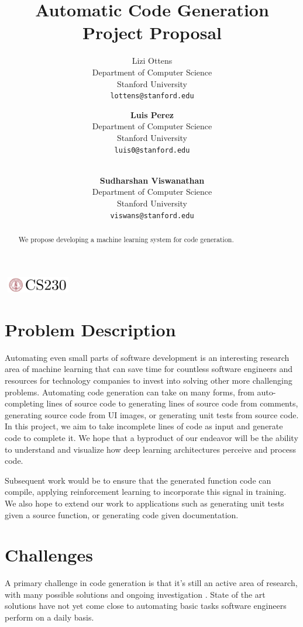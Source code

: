 \documentclass{article}
\title{Automatic Code Generation Project Proposal}
\author{
  Lizi Ottens  \\
  Department of Computer Science\\
  Stanford University\\
  \texttt{lottens@stanford.edu}
  
  \and
  
  \textbf{Luis Perez} \\
  Department of Computer Science \\
  Stanford University \\
  \texttt{luis0@stanford.edu}
  
  \and
  
  \\
  \textbf{Sudharshan Viswanathan} \\
  Department of Computer Science \\
  Stanford University \\
  \texttt{viswans@stanford.edu}
}
\begin{document}

\begin{center}
\includegraphics[width=3cm, height=0.7cm]{CS230}
\end{center}

\maketitle

\begin{abstract}
We propose developing a machine learning system for code generation.
\end{abstract}

\section{Problem Description}	
Automating even small parts of software development is an interesting research area \cite{survey} of machine learning that can save time for countless software engineers and resources for technology companies to invest into solving other more challenging problems. Automating code generation can take on many forms, from auto-completing lines of source code to generating lines of source code from comments, generating source code from UI images, or generating unit tests from source code. In this project, we aim to take incomplete lines of code as input and generate code to complete it. We hope that a byproduct of our endeavor will be the ability to understand and visualize \cite{visualizing_rnns} how deep learning architectures perceive and process code.

Subsequent work would be to ensure that the generated function code can compile, applying reinforcement learning to incorporate this signal in training. We also hope to extend our work to applications such as generating unit tests given a source function, or generating code given documentation. 


\section{Challenges}
A primary challenge in code generation is that it’s still an active area of research, with many possible solutions and ongoing investigation \cite{structural_code_modeling}. State of the art solutions have not yet come close to automating basic tasks software engineers perform on a daily basis.
\end{document}

